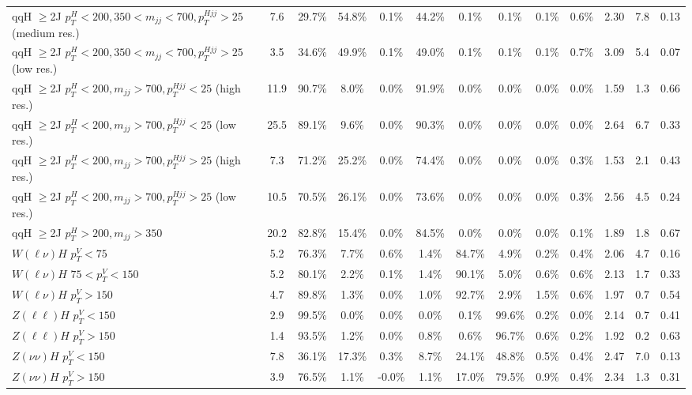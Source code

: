 \begin{table}
\begin{tabular}{lcccccccccccc}
qqH $\geq$2J $p_{T}^{H} < 200, 350 < m_{jj} < 700, p_{T}^{Hjj} > 25$ (medium res.) & 7.6 & 29.7\% & 54.8\% & 0.1\% & 44.2\% & 0.1\% & 0.1\% & 0.1\% & 0.6\% & 2.30 & 7.8 & 0.13 \\
qqH $\geq$2J $p_{T}^{H} < 200, 350 < m_{jj} < 700, p_{T}^{Hjj} > 25$ (low res.) & 3.5 & 34.6\% & 49.9\% & 0.1\% & 49.0\% & 0.1\% & 0.1\% & 0.1\% & 0.7\% & 3.09 & 5.4 & 0.07 \\
qqH $\geq$2J $p_{T}^{H} < 200, m_{jj} > 700, p_{T}^{Hjj} < 25$ (high res.) & 11.9 & 90.7\% & 8.0\% & 0.0\% & 91.9\% & 0.0\% & 0.0\% & 0.0\% & 0.0\% & 1.59 & 1.3 & 0.66 \\
qqH $\geq$2J $p_{T}^{H} < 200, m_{jj} > 700, p_{T}^{Hjj} < 25$ (low res.) & 25.5 & 89.1\% & 9.6\% & 0.0\% & 90.3\% & 0.0\% & 0.0\% & 0.0\% & 0.0\% & 2.64 & 6.7 & 0.33 \\
qqH $\geq$2J $p_{T}^{H} < 200, m_{jj} > 700, p_{T}^{Hjj} > 25$ (high res.) & 7.3 & 71.2\% & 25.2\% & 0.0\% & 74.4\% & 0.0\% & 0.0\% & 0.0\% & 0.3\% & 1.53 & 2.1 & 0.43 \\
qqH $\geq$2J $p_{T}^{H} < 200, m_{jj} > 700, p_{T}^{Hjj} > 25$ (low res.) & 10.5 & 70.5\% & 26.1\% & 0.0\% & 73.6\% & 0.0\% & 0.0\% & 0.0\% & 0.3\% & 2.56 & 4.5 & 0.24 \\
qqH $\geq$2J $p_{T}^{H} > 200, m_{jj} > 350$ & 20.2 & 82.8\% & 15.4\% & 0.0\% & 84.5\% & 0.0\% & 0.0\% & 0.0\% & 0.1\% & 1.89 & 1.8 & 0.67 \\
$W(\ell\nu)H$ $p_{T}^{V} < 75$ & 5.2 & 76.3\% & 7.7\% & 0.6\% & 1.4\% & 84.7\% & 4.9\% & 0.2\% & 0.4\% & 2.06 & 4.7 & 0.16 \\
$W(\ell\nu)H$ $75 < p_{T}^{V} < 150$ & 5.2 & 80.1\% & 2.2\% & 0.1\% & 1.4\% & 90.1\% & 5.0\% & 0.6\% & 0.6\% & 2.13 & 1.7 & 0.33 \\
$W(\ell\nu)H$ $p_{T}^{V} > 150$ & 4.7 & 89.8\% & 1.3\% & 0.0\% & 1.0\% & 92.7\% & 2.9\% & 1.5\% & 0.6\% & 1.97 & 0.7 & 0.54 \\
$Z(\ell\ell)H$ $p_{T}^{V} < 150$ & 2.9 & 99.5\% & 0.0\% & 0.0\% & 0.0\% & 0.1\% & 99.6\% & 0.2\% & 0.0\% & 2.14 & 0.7 & 0.41 \\
$Z(\ell\ell)H$ $p_{T}^{V} > 150$ & 1.4 & 93.5\% & 1.2\% & 0.0\% & 0.8\% & 0.6\% & 96.7\% & 0.6\% & 0.2\% & 1.92 & 0.2 & 0.63 \\
$Z(\nu\nu)H$ $p_{T}^{V} < 150$ & 7.8 & 36.1\% & 17.3\% & 0.3\% & 8.7\% & 24.1\% & 48.8\% & 0.5\% & 0.4\% & 2.47 & 7.0 & 0.13 \\
$Z(\nu\nu)H$  $p_{T}^{V} > 150$ & 3.9 & 76.5\% & 1.1\% & -0.0\% & 1.1\% & 17.0\% & 79.5\% & 0.9\% & 0.4\% & 2.34 & 1.3 & 0.31 \\

\end{tabular}
\end{table}
